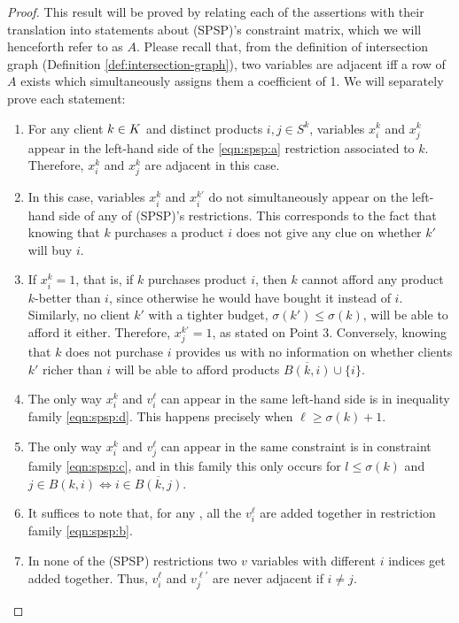 \begin{proof}
    This result will be proved by relating each of the assertions with their
    translation into statements about (SPSP)'s constraint matrix, which we will
    henceforth refer to as $A$. Please recall that, from the definition of
    intersection graph (Definition \ref{def:intersection-graph}), two variables
    are adjacent iff a row of $A$ exists which simultaneously assigns them a
    coefficient of 1. We will separately prove each statement:
    \begin{enumerate}
        \item %
	    For any client ${k \in K}$ and distinct products $i, j \in S^k$, variables
	    $x_i^k$ and $x_j^k$ appear in the left-hand side of the
	    \eqref{eqn:spsp:a} restriction associated to $k$. Therefore, $x_i^k$
	    and $x_j^k$ are adjacent in this case.
        \item %
	    In this case, variables $x_i^k$ and $x_i^{k'}$ do not simultaneously
	    appear on the left-hand side of any of (SPSP)'s restrictions. This
	    corresponds to the fact that knowing that $k$ purchases a product
	    $i$ does not give any clue on whether $k'$ will buy $i$.
        \item %
	    If $x_i^k = 1$, that is, if $k$ purchases product $i$, then $k$
	    cannot afford any product $k$-better than $i$, since otherwise he
	    would have bought it instead of $i$. Similarly, no client $k'$ with
	    a tighter budget, $\sigma(k') \leq \sigma(k)$, will be able to
	    afford it either. Therefore, $x_j^{k'} = 1$, as stated on Point 3.
	    Conversely, knowing that $k$ does not purchase $i$ provides us with
	    no information on whether clients $k'$ richer than $i$ will be able
	    to afford products $\overline{B(k, i)} \cup \{i\}$.
        \item %
	    The only way $x_i^k$ and $v_i^\ell$ can appear in the same left-hand
	    side is in inequality family \eqref{eqn:spsp:d}. This happens
	    precisely when $\ell \geq \sigma(k) + 1$.
        \item %
	    The only way $x_i^k$ and $v_j^\ell$ can appear in the same
	    constraint is in constraint family \ref{eqn:spsp:c}, and in this
	    family this only occurs for $l \leq \sigma(k)$ and $j \in B(k, i)
	    \iff i \in \overline{B(k, j)}$.
        \item %
	    It suffices to note that, for any \ii, all the $v_i^\ell$ are added
	    together in restriction family \eqref{eqn:spsp:b}.
        \item %
	    In none of the (SPSP) restrictions two $v$ variables with different
	    $i$ indices get added together. Thus, $v_i^\ell$ and $v_j^{\ell'}$
	    are never adjacent if $i \neq j$.
    \end{enumerate}
\end{proof}

